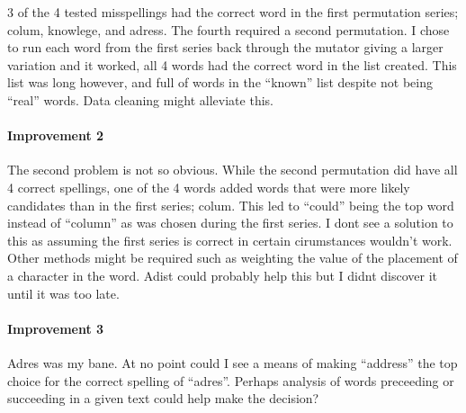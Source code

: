 \documentclass[]{article}
\let\oldparagraph\paragraph
\renewcommand{\paragraph}[1]{\oldparagraph{#1}\mbox{}}
\begin{document}
3 of the 4 tested misspellings had the correct word in the first
permutation series; colum, knowlege, and adress. The fourth required a
second permutation. I chose to run each word from the first series back
through the mutator giving a larger variation and it worked, all 4 words
had the correct word in the list created. This list was long however,
and full of words in the ``known'' list despite not being ``real''
words. Data cleaning might alleviate this.

\hypertarget{improvement-2}{%
\paragraph{Improvement 2}\label{improvement-2}}

The second problem is not so obvious. While the second permutation did
have all 4 correct spellings, one of the 4 words added words that were
more likely candidates than in the first series; colum. This led to
``could'' being the top word instead of ``column'' as was chosen during
the first series. I dont see a solution to this as assuming the first
series is correct in certain cirumstances wouldn't work. Other methods
might be required such as weighting the value of the placement of a
character in the word. Adist could probably help this but I didnt
discover it until it was too late.

\hypertarget{improvement-3}{%
\paragraph{Improvement 3}\label{improvement-3}}

Adres was my bane. At no point could I see a means of making ``address''
the top choice for the correct spelling of ``adres''. Perhaps analysis
of words preceeding or succeeding in a given text could help make the
decision?
\end{document}
